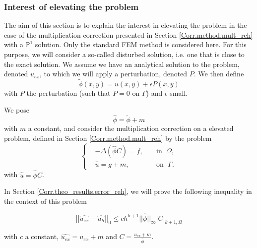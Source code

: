 \subsubsection{Interest of elevating the problem} \label{Corr.theo_results.reh}

The aim of this section is to explain the interest in elevating the problem in the case of the multiplication correction presented in Section \ref{Corr.method.mult_reh} with a $\mathbb{P}^1$ solution. Only the standard FEM method is considered here. For this purpose, we will consider a so-called disturbed solution, i.e. one that is close to the exact solution. We assume we have an analytical solution to the problem, denoted $u_{ex}$, to which we will apply a perturbation, denoted $P$. We then define
\begin{equation*}
	\tilde{\phi}(x,y) = u(x,y)+\epsilon P(x,y)
\end{equation*}
with $P$ the perturbation (such that $P=0$ on $\Gamma$) and $\epsilon$ small.

We pose
\begin{equation*}
	\hat{\phi}=\tilde{\phi}+m
\end{equation*}
with $m$ a constant, and consider the multiplication correction on a elevated problem, defined in Section \ref{Corr.method.mult_reh} by the problem
\begin{equation*}
	\left\{\begin{aligned}
		&-\Delta (\hat{\phi}C)=f, \; &&\text{in } \; \Omega, \\
		&\hat{u}=g+m, \; &&\text{on } \; \Gamma.
	\end{aligned}\right.
\end{equation*}
with $\hat{u}=\hat{\phi}C$.

In Section \ref{Corr.theo_results.error_reh}, we will prove the following inequality in the context of this problem

\begin{equation*}
	\left|\left|\hat{u_{ex}}-\hat{u_h}\right|\right|_0\le ch^{k+1}||\hat{\phi}||_\infty\left|C\right|_{k+1,\Omega}
\end{equation*}

with $c$ a constant, $\hat{u_{ex}}=u_{ex}+m$ and $C=\frac{u_{ex}+m}{\hat{\phi}}$.

